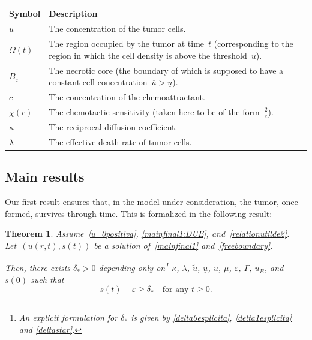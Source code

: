 \documentclass[12pt,a4paper,intlimits,sumlimits]{amsart}
\theoremstyle{definition}
\theoremstyle{plain}
\newtheorem{theorem}[definition]{Theorem}
\numberwithin{equation}{section}
\renewcommand{\geq}{\geqslant}
\renewcommand{\ge}{\geqslant}
\begin{document}
\begin{center}
\begin{tabularx}{\textwidth}{ >{\centering\arraybackslash}m{1.5cm} X }
\toprule
\textbf{Symbol} & \textbf{Description} \\
\midrule
$u$ & The concentration of the tumor cells. \\
\midrule
$\Omega(t)$ & 
The region occupied by the tumor at time~$t$
(corresponding to the region in which the cell density is above the threshold~$\widetilde{u}$).\\
\midrule
$B_\varepsilon$ & The necrotic core (the boundary of which is supposed
to have a constant cell concentration~$\overline{u}>\underline{u}$). \\
\midrule
$c$ & The concentration of the chemoattractant. \\
\midrule
$\chi(c)$ & The chemotactic sensitivity
(taken here to be of the form~$\frac2{c}$). \\
\midrule
$\kappa$ & The reciprocal diffusion coefficient. \\
\midrule
$\lambda $  & The effective death rate of tumor cells. \\
\bottomrule
\end{tabularx}
\end{center}
\medskip

\subsection{Main results}
Our first result ensures that, in the model under consideration, the tumor, once formed, survives through time. This is formalized in the following result:

\begin{theorem}\label{th:main1}
Assume~\eqref{u_0positiva},
\eqref{mainfinal1:DUE}, and~\eqref{relationutilde2}.
Let~$(u(r,t), s(t))$ be a solution of~\eqref{mainfinal1} and~\eqref{freeboundary}.

Then, there exists $\delta_*>0$ depending only on\footnote{An explicit formulation for $\delta_*$ is given by \eqref{delta0esplicita}, \eqref{delta1esplicita} and \eqref{deltastar}.}
 $\kappa$, $\lambda$, $\widetilde u$, $\underline u$, $\overline u$, $\mu$, $\varepsilon$, $\Gamma$, $u_B$, and~$s(0)$ such that
\begin{equation}\label{deltastarclaim}
s(t)- \varepsilon\ge\delta_* \quad \mbox{for any }t\geq 0.
\end{equation}
\end{theorem}
\end{document}
